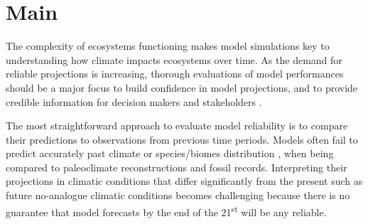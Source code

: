 \documentclass[pdflatex, sn-nature]{sn-jnl}%
\begin{document}

\maketitle

\newpage




\section{Main}
The complexity of ecosystems functioning makes model simulations key to understanding how climate impacts ecosystems over time. As the demand for reliable projections is increasing, thorough evaluations of model performances should be a major focus to build confidence in model projections, and to provide credible information for decision makers and stakeholders \cite{Dawson2011, Mouquet2015, Pacifici2015}.

The most straightforward approach to evaluate model reliability is to compare their predictions to observations from previous time periods. Models often fail to predict accurately past climate \cite{Harrison2015} or species/biomes distribution \cite{Veloz2012, Pearman2008, Roberts2012, Foley2013}, when being compared to paleoclimate reconstructions and fossil records. Interpreting their projections in climatic conditions that differ significantly from the present \cite{Maguire2016} such as future no-analogue climatic conditions  \cite{Williams2007} becomes challenging because there is no guarantee that model forecasts by the end of the 21\textsuperscript{st} \cite{Fitzpatrick2018} will be any reliable.
\end{document}
